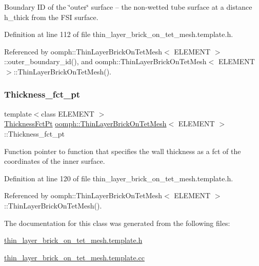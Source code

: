 Boundary ID of the \char`\"{}outer\char`\"{} surface -- the non-\/wetted tube surface at a distance h\+\_\+thick from the F\+SI surface. 



Definition at line 112 of file thin\+\_\+layer\+\_\+brick\+\_\+on\+\_\+tet\+\_\+mesh.\+template.\+h.



Referenced by oomph\+::\+Thin\+Layer\+Brick\+On\+Tet\+Mesh$<$ E\+L\+E\+M\+E\+N\+T $>$\+::outer\+\_\+boundary\+\_\+id(), and oomph\+::\+Thin\+Layer\+Brick\+On\+Tet\+Mesh$<$ E\+L\+E\+M\+E\+N\+T $>$\+::\+Thin\+Layer\+Brick\+On\+Tet\+Mesh().

\mbox{\label{classoomph_1_1ThinLayerBrickOnTetMesh_a51d5c130c6b267fc8996e02d1172c81d}} 
\subsubsection{\texorpdfstring{Thickness\+\_\+fct\+\_\+pt}{Thickness\_fct\_pt}}
{\footnotesize\ttfamily template$<$class E\+L\+E\+M\+E\+NT $>$ \\
\hyperlink{classoomph_1_1ThinLayerBrickOnTetMesh_aed34f7d1e9a5c6b5f3e220cb5bdf4550}{Thickness\+Fct\+Pt} \hyperlink{classoomph_1_1ThinLayerBrickOnTetMesh}{oomph\+::\+Thin\+Layer\+Brick\+On\+Tet\+Mesh}$<$ E\+L\+E\+M\+E\+NT $>$\+::Thickness\+\_\+fct\+\_\+pt\hspace{0.3cm}{\ttfamily [private]}}



Function pointer to function that specifies the wall thickness as a fct of the coordinates of the inner surface. 



Definition at line 120 of file thin\+\_\+layer\+\_\+brick\+\_\+on\+\_\+tet\+\_\+mesh.\+template.\+h.



Referenced by oomph\+::\+Thin\+Layer\+Brick\+On\+Tet\+Mesh$<$ E\+L\+E\+M\+E\+N\+T $>$\+::\+Thin\+Layer\+Brick\+On\+Tet\+Mesh().



The documentation for this class was generated from the following files\+:\begin{DoxyCompactItemize}
\item 
\hyperlink{thin__layer__brick__on__tet__mesh_8template_8h}{thin\+\_\+layer\+\_\+brick\+\_\+on\+\_\+tet\+\_\+mesh.\+template.\+h}\item 
\hyperlink{thin__layer__brick__on__tet__mesh_8template_8cc}{thin\+\_\+layer\+\_\+brick\+\_\+on\+\_\+tet\+\_\+mesh.\+template.\+cc}\end{DoxyCompactItemize}
